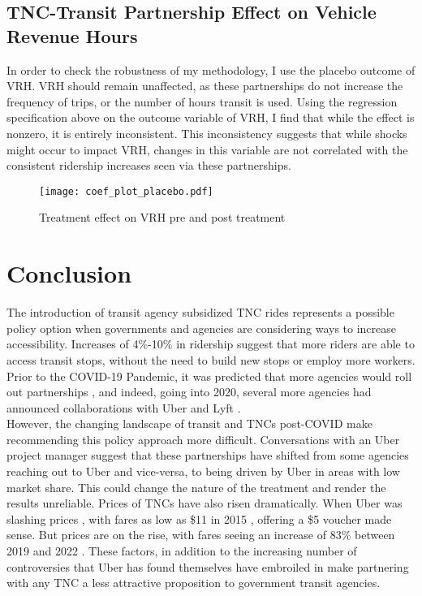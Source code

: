 \documentclass [12pt]{report}
\begin{document}
\subsection*{TNC-Transit Partnership Effect on Vehicle Revenue Hours}
In order to check the robustness of my methodology, I use the placebo outcome of VRH. VRH should remain unaffected, as these partnerships do not increase the frequency of trips, or the number of hours transit is used. Using the regression specification above on the outcome variable of VRH, I find that while the effect is nonzero, it is entirely inconsistent. This inconsistency suggests that while shocks might occur to impact VRH, changes in this variable are not correlated with the consistent ridership increases seen via these partnerships.
\begin{figure}[H]
    \centering
    \texttt{[image: coef\_plot\_placebo.pdf]} %
    \caption{Treatment effect on VRH pre and post treatment}
\end{figure}

\section*{Conclusion}
The introduction of transit agency subsidized TNC rides represents a possible policy option when governments and agencies are considering ways to increase accessibility. Increases of 4\%-10\% in ridership suggest that more riders are able to access transit stops, without the need to build new stops or employ more workers. Prior to the COVID-19 Pandemic, it was predicted that more agencies would roll out partnerships \parencite{depaul}, and indeed, going into 2020, several more agencies had announced collaborations with Uber and Lyft \parencite{atpapartner}. \\
\indent However, the changing landscape of transit and TNCs post-COVID make recommending this policy approach more difficult. Conversations with an Uber project manager suggest that these partnerships have shifted from some agencies reaching out to Uber and vice-versa, to being driven by Uber in areas with low market share. This could change the nature of the treatment and render the results unreliable. Prices of TNCs have also risen dramatically. When Uber was slashing prices , with fares as low as \$11 in 2015 \parencite{vox}, offering a \$5 voucher made sense. But prices are on the rise, with fares seeing an increase of 83\% between 2019 and 2022 \parencite{sherman}. These factors, in addition to the increasing number of controversies that Uber has found themselves have embroiled in \parencite{guardian} make partnering with any TNC a less attractive proposition to government transit agencies.
\end{document}
